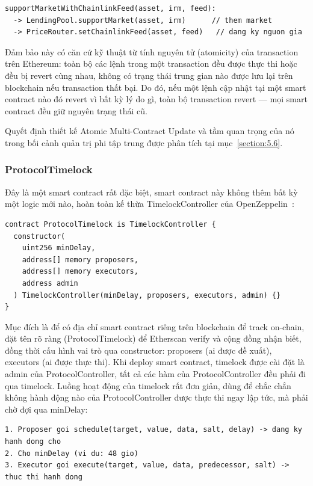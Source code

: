 \documentclass[../DoAn.tex]{subfiles}
\begin{document}
\begin{lstlisting}
supportMarketWithChainlinkFeed(asset, irm, feed):
  -> LendingPool.supportMarket(asset, irm)      // them market
  -> PriceRouter.setChainlinkFeed(asset, feed)   // dang ky nguon gia
\end{lstlisting}


Đảm bảo này có căn cứ kỹ thuật từ tính nguyên tử (atomicity) của transaction trên Ethereum: toàn bộ các lệnh trong một transaction đều được thực thi hoặc đều bị revert cùng nhau, không có trạng thái trung gian nào được lưu lại trên blockchain nếu transaction thất bại. Do đó, nếu một lệnh cập nhật tại một smart contract nào đó revert vì bất kỳ lý do gì, toàn bộ transaction revert --- mọi smart contract đều giữ nguyên trạng thái cũ.

Quyết định thiết kế Atomic Multi-Contract Update và tầm quan trọng của nó trong bối cảnh quản trị phi tập trung được phân tích tại mục~\ref{section:5.6}.

\subsubsection{ProtocolTimelock}


Đây là một smart contract rất đặc biệt, smart contract này không thêm bất kỳ một logic mới nào, hoàn toàn kế thừa TimelockController của OpenZeppelin~\cite{OpenZeppelinDocs}:
\begin{lstlisting}
contract ProtocolTimelock is TimelockController {
  constructor(
    uint256 minDelay,
    address[] memory proposers,
    address[] memory executors,
    address admin
  ) TimelockController(minDelay, proposers, executors, admin) {}
}
\end{lstlisting}

Mục đích là để có địa chỉ smart contract riêng trên blockchain để track on-chain, đặt tên rõ ràng (ProtocolTimelock) để Etherscan verify và cộng đồng nhận biết, đồng thời cấu hình vai trò qua constructor: proposers (ai được đề xuất), executors (ai được thực thi). Khi deploy smart contract, timelock được cài đặt là admin của ProtocolController, tất cả các hàm của ProtocolController đều phải đi qua timelock. Luồng hoạt động của timelock rất đơn giản, dùng để chắc chắn không hành động nào của ProtocolController được thực thi ngay lập tức, mà phải chờ đợi qua minDelay:

\begin{lstlisting}
1. Proposer goi schedule(target, value, data, salt, delay) -> dang ky hanh dong cho
2. Cho minDelay (vi du: 48 gio)
3. Executor goi execute(target, value, data, predecessor, salt) -> thuc thi hanh dong
\end{lstlisting}
\end{document}
